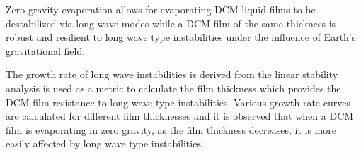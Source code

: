 \documentclass[a4paper,12pt]{article}
\begin{document}
Zero gravity evaporation allows for evaporating DCM liquid films to be destabilized via long wave modes while a DCM film of the same thickness is robust and resilient to long wave type instabilities under the influence of Earth's gravitational field.





The growth rate of long wave instabilities is derived from the linear stability analysis is used as a metric to calculate the film thickness which provides the DCM film resistance to long wave type instabilities. Various growth rate curves are calculated for different film thicknesses and it is observed that when a DCM film is evaporating in zero gravity, as the film thickness decreases, it is more easily affected by long wave type instabilities.
\end{document}
